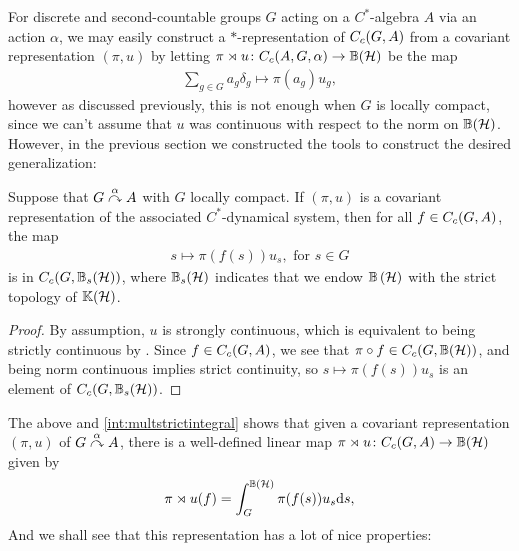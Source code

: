 For discrete and second-countable groups $G$ acting on a $C^*$-algebra $A$ via an action $\alpha$, we may easily construct a $*$-representation of $C_c(G,A)$ from a covariant representation $(\pi,u)$ by letting $\pi \rtimes u \colon C_c(A,G,\alpha) \to \mathbb{B}(\mathcal{H})$ be the map
\begin{align*}
	\sum_{g \in G} a_g \delta_g \mapsto \pi(a_g) u_g,
\end{align*}
however as discussed previously, this is not enough when $G$ is locally compact, since we can't assume that $u$ was continuous with respect to the norm on $\mathbb{B}(\mathcal{H})$. However, in the previous section we constructed the tools to construct the desired generalization:
\begin{lemma}
	Suppose that $G \stackrel{\alpha}{\curvearrowright} A$ with $G$ locally compact. If $(\pi,u)$ is a covariant representation of the associated $C^*$-dynamical system, then for all $f \in C_c(G,A)$, the map
	\begin{align*}
		s \mapsto \pi(f(s)) u_s, \text{ for }s \in G
	\end{align*}
	is in $C_c(G,\mathbb{B}_s(\mathcal{H}))$, where $\mathbb{B}_s(\mathcal{H})$ indicates that we endow $\mathbb{B}\left(\mathcal{H} \right)$ with the strict topology of $ \mathbb{K}(\mathcal{H})$.
	\label{cross:integrandcont}
\end{lemma}
\begin{proof}
	By assumption, $u$ is strongly continuous, which is equivalent to being strictly continuous by . Since $f \in C_c(G,A)$, we see that $\pi \circ f \in C_c(G,\mathbb{B}(\mathcal{H}))$, and being norm continuous implies strict continuity, so $s \mapsto \pi(f(s)) u_s$ is an element of $C_c(G,\mathbb{B}_s(\mathcal{H}))$.
\end{proof}
The above and \ref{int:multstrictintegral} shows that given a covariant representation $(\pi,u)$ of $G \stackrel{\alpha}{\curvearrowright} A$, there is a well-defined linear map $\pi \rtimes u \colon C_c(G,A) \to \mathbb{B}(\mathcal{H})$ given by
\begin{align*}
	\pi \rtimes u (f) = \int_G^{\mathbb{B}(\mathcal{H})} \pi(f(s)) u_s \mathrm{d} s,
\end{align*}
And we shall see that this representation has a lot of nice properties:

